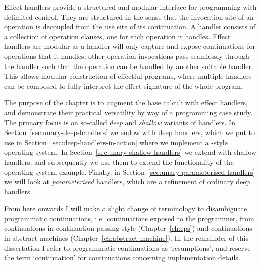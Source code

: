 \documentclass[12pt,phd,lfcs,twoside,openright,logo,leftchapter,normalheadings]{infthesis}
\theoremstyle{plain}
\theoremstyle{definition}
\begin{document}
Effect handlers provide a structured and modular interface for
programming with delimited control. They are structured in the sense
that the invocation site of an operation is decoupled from the use
site of its continuation. A handler consists of a collection of
operation clauses, one for each operation it handles. Effect handlers
are modular as a handler will only capture and expose continuations
for operations that it handles, other operation invocations pass
seamlessly through the handler such that the operation can be handled
by another suitable handler. This allows modular construction of
effectful programs, where multiple handlers can be composed to fully
interpret the effect signature of the whole program.

%
The purpose of the chapter is to augment the base calculi \BCalc{}
with effect handlers, and demonstrate their practical versatility by
way of a programming case study. The primary focus is on so-called
\emph{deep} and \emph{shallow} variants of handlers. In
Section~\ref{sec:unary-deep-handlers} we endow \BCalc{} with deep
handlers, which we put to use in
Section~\ref{sec:deep-handlers-in-action} where we implement a
\UNIX{}-style operating system. In
Section~\ref{sec:unary-shallow-handlers} we extend \BCalc{} with shallow
handlers, and subsequently we use them to extend the functionality of
the operating system example. Finally, in
Section~\ref{sec:unary-parameterised-handlers} we will look at
\emph{parameterised} handlers, which are a refinement of ordinary deep
handlers.

From here onwards I will make a slight change of terminology to
disambiguate programmatic continuations, i.e. continuations exposed to
the programmer, from continuations in continuation passing style
(Chapter~\ref{ch:cps}) and continuations in abstract machines
(Chapter~\ref{ch:abstract-machine}). In the remainder of this
dissertation I refer to programmatic continuations as `resumptions',
and reserve the term `continuation' for continuations concerning
implementation details.
\end{document}
